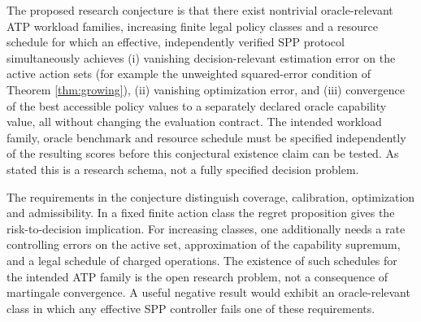 \documentclass[11pt]{article}
\begin{document}
\begin{conjecture}
The proposed research conjecture is that there exist nontrivial oracle-relevant ATP workload families, increasing finite legal policy classes and a resource schedule for which an effective, independently verified SPP protocol simultaneously achieves (i) vanishing decision-relevant estimation error on the active action sets (for example the unweighted squared-error condition of Theorem \ref{thm:growing}), (ii) vanishing optimization error, and (iii) convergence of the best accessible policy values to a separately declared oracle capability value, all without changing the evaluation contract. The intended workload family, oracle benchmark and resource schedule must be specified independently of the resulting scores before this conjectural existence claim can be tested. As stated this is a research schema, not a fully specified decision problem.
\end{conjecture}
The requirements in the conjecture distinguish coverage, calibration, optimization and admissibility. In a fixed finite action class the regret proposition gives the risk-to-decision implication. For increasing classes, one additionally needs a rate controlling errors on the active set, approximation of the capability supremum, and a legal schedule of charged operations. The existence of such schedules for the intended ATP family is the open research problem, not a consequence of martingale convergence. A useful negative result would exhibit an oracle-relevant class in which any effective SPP controller fails one of these requirements.
\end{document}
